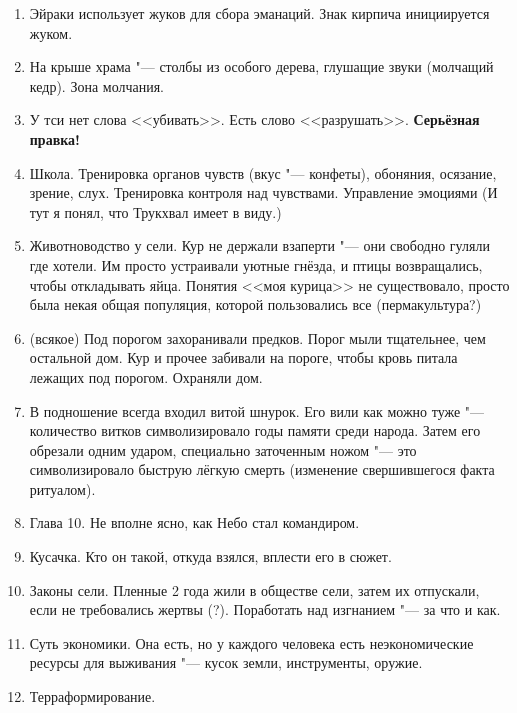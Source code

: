\documentclass[a4paper,10pt,fleqn]{book}
\begin{document}
\begin{enumerate}
\item Эйраки использует жуков для сбора эманаций.
Знак кирпича инициируется жуком.

\item На крыше храма "--- столбы из особого дерева, глушащие звуки (молчащий кедр).
Зона молчания.

\item У тси нет слова <<убивать>>.
Есть слово <<разрушать>>.
\textbf{Серьёзная правка!}

\item Школа.
Тренировка органов чувств (вкус "--- конфеты), обоняния, осязание, зрение, слух.
Тренировка контроля над чувствами.
Управление эмоциями (И тут я понял, что Трукхвал имеет в виду.)

\item Животноводство у сели.
Кур не держали взаперти "--- они свободно гуляли где хотели.
Им просто устраивали уютные гнёзда, и птицы возвращались, чтобы откладывать яйца.
Понятия <<моя курица>> не существовало, просто была некая общая популяция, которой пользовались все (пермакультура?)

\item (всякое) Под порогом захоранивали предков.
Порог мыли тщательнее, чем остальной дом.
Кур и прочее забивали на пороге, чтобы кровь питала лежащих под порогом.
Охраняли дом.

\item В подношение всегда входил витой шнурок.
Его вили как можно туже "--- количество витков символизировало годы памяти среди народа.
Затем его обрезали одним ударом, специально заточенным ножом "--- это символизировало быструю лёгкую смерть (изменение свершившегося факта ритуалом).

\item Глава 10.
Не вполне ясно, как Небо стал командиром.

\item Кусачка.
Кто он такой, откуда взялся, вплести его в сюжет.

\item Законы сели.
Пленные 2 года жили в обществе сели, затем их отпускали, если не требовались жертвы (?).
Поработать над изгнанием "--- за что и как.

\item Суть экономики.
Она есть, но у каждого человека есть неэкономические ресурсы для выживания "--- кусок земли, инструменты, оружие.

\item Терраформирование.


\end{enumerate}
\end{document}
